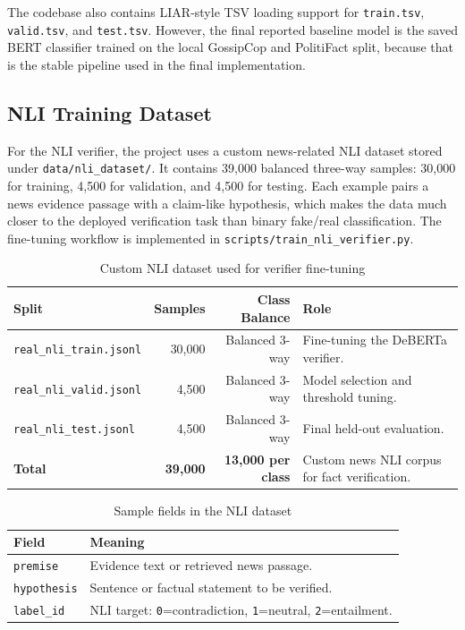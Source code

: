 \documentclass[11pt]{article}
\newcommand{\code}[1]{\texttt{#1}}
\begin{document}
The codebase also contains LIAR-style TSV loading support for
\code{train.tsv}, \code{valid.tsv}, and \code{test.tsv}. However, the final
reported baseline model is the saved BERT classifier trained on the local
GossipCop and PolitiFact split, because that is the stable pipeline used in the
final implementation.

\subsection{NLI Training Dataset}

For the NLI verifier, the project uses a custom news-related NLI dataset stored
under \code{data/nli\_dataset/}. It contains 39,000 balanced three-way samples:
30,000 for training, 4,500 for validation, and 4,500 for testing. Each example
pairs a news evidence passage with a claim-like hypothesis, which makes the data
much closer to the deployed verification task than binary fake/real
classification. The fine-tuning workflow is implemented in
\code{scripts/train\_nli\_verifier.py}.

\begin{table}[htbp]
    \centering
    \caption{Custom NLI dataset used for verifier fine-tuning}
    \begin{tabularx}{\textwidth}{@{}lrrY@{}}
        \toprule
        \textbf{Split} & \textbf{Samples} & \textbf{Class Balance} & \textbf{Role} \\
        \midrule
        \code{real\_nli\_train.jsonl} & 30,000 & Balanced 3-way & Fine-tuning the DeBERTa verifier. \\
        \code{real\_nli\_valid.jsonl} & 4,500 & Balanced 3-way & Model selection and threshold tuning. \\
        \code{real\_nli\_test.jsonl} & 4,500 & Balanced 3-way & Final held-out evaluation. \\
        \midrule
        \textbf{Total} & \textbf{39,000} & \textbf{13,000 per class} & Custom news NLI corpus for fact verification. \\
        \bottomrule
    \end{tabularx}
\end{table}

\begin{table}[htbp]
    \centering
    \caption{Sample fields in the NLI dataset}
    \begin{tabularx}{\textwidth}{@{}lY@{}}
        \toprule
        \textbf{Field} & \textbf{Meaning} \\
        \midrule
        \code{premise} & Evidence text or retrieved news passage. \\
        \code{hypothesis} & Sentence or factual statement to be verified. \\
        \code{label\_id} & NLI target: \code{0}=contradiction, \code{1}=neutral, \code{2}=entailment. \\
        \bottomrule
    \end{tabularx}
\end{table}
\end{document}
